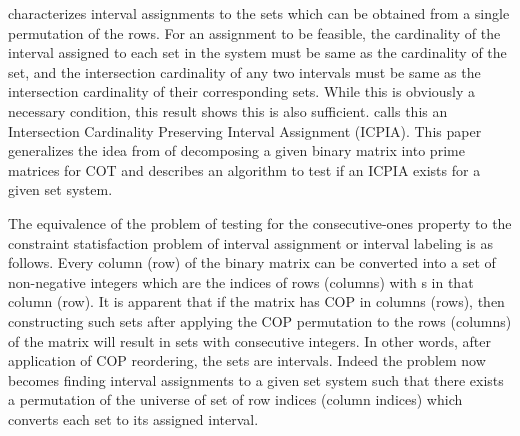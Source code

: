 \documentclass[MS]             %
              {iitmdiss_as}    %
\begin{document}
\cite{nsnrs09} characterizes interval assignments to the sets which
can be obtained from a single permutation of the rows.  For an
assignment to be feasible, the cardinality of the interval assigned to
each set in the system must be same as the cardinality of the set, and
the intersection cardinality of any two intervals must be same as the
intersection cardinality of their corresponding sets.  While this is
obviously a necessary condition, this result shows this is also
sufficient.  \cite{nsnrs09} calls this an Intersection Cardinality
Preserving Interval Assignment (ICPIA).  This paper generalizes the
idea from \cite{wlh02} of decomposing a given binary matrix into prime
matrices for COT and describes an algorithm to test if an ICPIA exists
for a given set system.

The equivalence of the problem of testing for the consecutive-ones
property to the constraint statisfaction problem of interval
assignment \cite{nsnrs09} or interval labeling \cite{kklv10} is as
follows. Every column (row) of the binary matrix can be converted into
a set of non-negative integers which are the indices of rows (columns)
with {\un}s in that column (row). It is apparent that if the matrix
has COP in columns (rows), then constructing such sets after applying
the COP permutation to the rows (columns) of the matrix will result in
sets with consecutive integers. In other words, after application of
COP reordering, the sets are intervals. Indeed the problem now becomes
finding interval assignments to a given set system such that there
exists a permutation of the universe of set of row indices (column
indices) which converts each set to its assigned interval.
\end{document}
